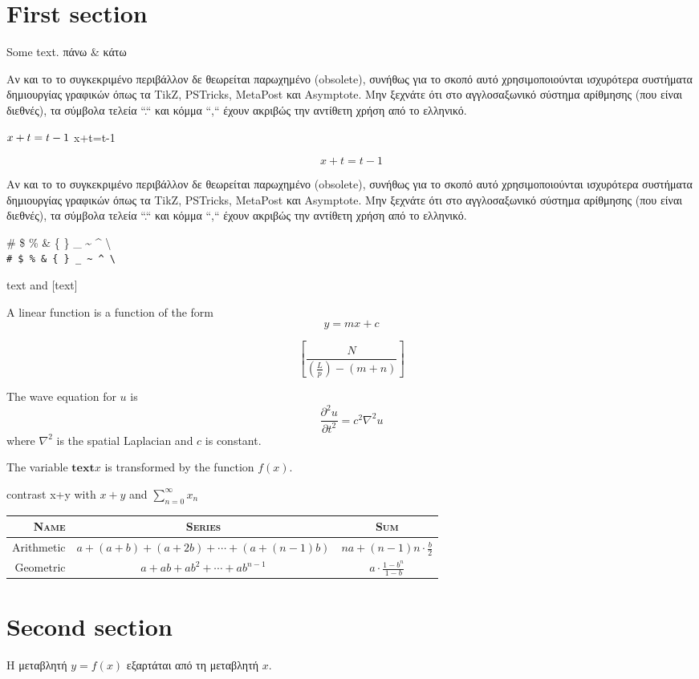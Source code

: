\documentclass{article}
\begin{document}
	
	\section{First section}
	Some text. πάνω \& κάτω
	

Αν και το το συγκεκριμένο περιβάλλον δε θεωρείται παρωχημένο (obsolete), συνήθως για το σκοπό αυτό χρησιμοποιούνται ισχυρότερα συστήματα δημιουργίας γραφικών όπως τα TikZ, PSTricks, MetaPost και Asymptote. Μην ξεχνάτε ότι στο αγγλοσαξωνικό σύστημα αρίθμησης (που είναι διεθνές), τα σύμβολα τελεία ``.`` και κόμμα ``,`` έχουν ακριβώς την αντίθετη χρήση από το ελληνικό.

\(\mathversion{bold} x+t=t-1\)  x+t=t-1

\[x+t=t-1\]



	
	
	\begin{sloppypar}
		Αν και το το συγκεκριμένο περιβάλλον δε θεωρείται παρωχημένο (obsolete), συνήθως για το σκοπό αυτό χρησιμοποιούνται ισχυρότερα συστήματα δημιουργίας γραφικών όπως τα TikZ, PSTricks, MetaPost και Asymptote. Μην ξεχνάτε ότι στο αγγλοσαξωνικό σύστημα αρίθμησης (που είναι διεθνές), τα σύμβολα τελεία ``.`` και κόμμα ``,`` έχουν ακριβώς την αντίθετη χρήση από το ελληνικό.
	\end{sloppypar}


\begin{center}
	\# \$ \% \& \{ \} \_ \~{} \^{} \textbackslash \\
	\verb!# $ % & { } _ ~ ^ \!
\end{center}

text and [text]

A linear function is a function of the form \[ y = mx + c \]

\[ 
\left[  \frac{ N } { \left( \frac{L}{p} \right)  - (m+n) }  \right]
\]
	
	
	The wave equation for \( u \) is
	\begin{displaymath}
	\frac{\partial^2u}{\partial t^2} = c^2\nabla^2u
	\end{displaymath}
	where \( \nabla^2 \) is the spatial Laplacian and \( c \) is constant.
	
	
	
	The variable \(\mathbf{text}x\) is transformed by the function \(f(x)\).
	
	contrast x+y with \( x+y \) and \(\displaystyle \sum_{n=0}^\infty x_n\)
	
	\begin{tabular}{r|cc}
		\textsc{Name}  &\textsc{Series}  &\textsc{Sum}  \\  \hline
		Arithmetic     &\( a+(a+b)+(a+2b)+\cdots+(a+(n-1)b) \)
		&\( na+(n-1)n\cdot\frac{b}{2}\)  \\
		Geometric      &\( a+ab+ab^2+\cdots+ab^{n-1} \)
		&\(\displaystyle a\cdot\frac{1-b^n}{1-b}\)  \\
	\end{tabular}
	
	\section{Second section}
	
	
	Η μεταβλητή \begin{math} y = f(x) \end{math} εξαρτάται από τη μεταβλητή \begin{math} x \end{math}.
\end{document}
